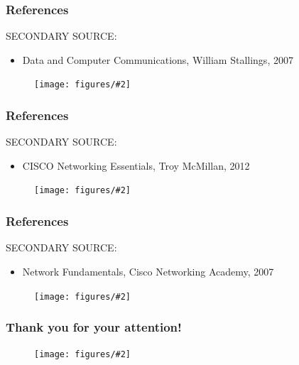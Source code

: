 \documentclass{beamer}
\newcommand{\fig}[2]{
\begin{center}
\begin{figure}
\texttt{[image: figures/\#2]}
\end{figure}
\end{center}
}
\begin{document}
\begin{frame}
\frametitle{References}
\Large
SECONDARY SOURCE: 
\begin{itemize}
\item  <1-> Data and Computer Communications, William Stallings, 2007
 \end{itemize}
\fig{0.3}{stallings2007}
\end{frame}
 

\begin{frame}
\frametitle{References}
\Large
SECONDARY SOURCE: 
\begin{itemize}
\item  <1-> CISCO Networking Essentials, Troy McMillan, 2012
 \end{itemize}
\fig{0.3}{mcmillan2012}
\end{frame}

\begin{frame}
\frametitle{References}
\Large
SECONDARY SOURCE: 
\begin{itemize}
\item  <1-> Network Fundamentals, Cisco Networking Academy, 2007
 \end{itemize}
\fig{0.4}{cisco}
\end{frame}


\begin{frame}
\frametitle{Thank you for your attention!}
\fig{0.6}{mthesis}
\end{frame}
\end{document}

